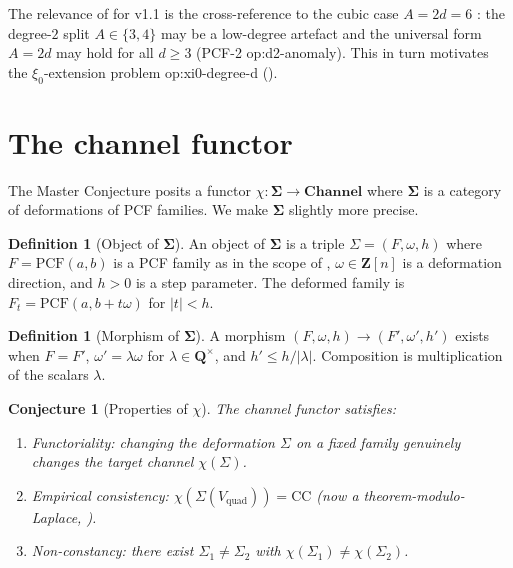 \documentclass[11pt,reqno]{amsart}
\theoremstyle{plain}
\newtheorem{conjecture}[theorem]{Conjecture}
\theoremstyle{definition}
\newtheorem{definition}[theorem]{Definition}
\theoremstyle{remark}
\newcommand{\Channel}{\mathbf{Channel}}
\newcommand{\Sigmaspace}{\mathbf{\Sigma}}
\newcommand{\PCF}{\mathrm{PCF}}
\newcommand{\CC}{\mathrm{CC}}
\newcommand{\Vquad}{V_{\mathrm{quad}}}
\begin{document}
The relevance of  for v1.1 is the
cross-reference to the cubic case
$A = 2d = 6$ \cite{siarc_pcf2_v11}: the degree-$2$ split
$A \in \{3, 4\}$ may be a low-degree artefact and the
universal form $A = 2d$ may hold for all $d \ge 3$ (PCF-2
\textsf{op:d2-anomaly}). This in turn motivates the
$\xi_0$-extension problem \textsf{op:xi0-degree-d}
().

\section{The channel functor}
\label{sec:functor}

The Master Conjecture \cite{siarc_umbrella} posits a functor
$\chi : \Sigmaspace \to \Channel$ where $\Sigmaspace$ is a
category of deformations of PCF families. We make
$\Sigmaspace$ slightly more precise.

\begin{definition}[Object of $\Sigmaspace$]
An object of $\Sigmaspace$ is a triple
$\Sigma = (F, \omega, h)$ where $F = \PCF(a, b)$ is a PCF
family as in the scope of ,
$\omega \in \mathbf{Z}[n]$ is a deformation direction, and
$h > 0$ is a step parameter. The deformed family is
$F_t = \PCF(a, b + t \omega)$ for $|t| < h$.
\end{definition}

\begin{definition}[Morphism of $\Sigmaspace$]
A morphism
$(F, \omega, h) \to (F', \omega', h')$ exists when $F = F'$,
$\omega' = \lambda \omega$ for $\lambda \in \mathbf{Q}^\times$,
and $h' \le h / |\lambda|$. Composition is multiplication of
the scalars $\lambda$.
\end{definition}

\begin{conjecture}[Properties of $\chi$]
\label{conj:chi}
The channel functor satisfies:
\begin{enumerate}[label=(\roman*)]
\item Functoriality: changing the deformation $\Sigma$ on a
fixed family genuinely changes the target channel $\chi(\Sigma)$.
\item Empirical consistency:
$\chi(\Sigma(\Vquad)) = \CC$ (now a theorem-modulo-Laplace,
).
\item Non-constancy: there exist $\Sigma_1 \neq \Sigma_2$
with $\chi(\Sigma_1) \ne \chi(\Sigma_2)$.
\end{enumerate}
\end{conjecture}
\end{document}

